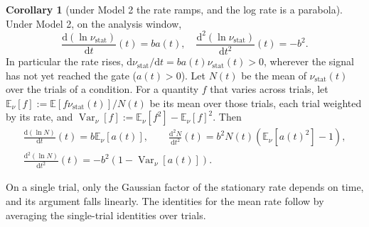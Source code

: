 \documentclass[a4paper,11pt]{article}
\theoremstyle{definition}
\newtheorem{corollary}[proposition]{Corollary}
\newcommand{\E}{\mathbb E}
\newcommand{\Var}{\operatorname{Var}}
\newcommand{\dd}{\mathrm d}
\newcommand{\nustat}{{\nu }_{\mathrm{stat}}}
\newcommand{\1}{\mathbbm{1}}
\begin{document}
\begin{corollary}[under Model 2 the rate ramps, and the log rate is a parabola]\label{cor:logslope}
Under Model 2, on the analysis window,
\begin{equation}
\frac{\dd \left(\ln \nustat \right)}{\dd t}\left(t\right)=b a\left(t\right), \quad \frac{{\dd }^{2}\left(\ln \nustat \right)}{\dd {t}^{2}}\left(t\right)=-{b}^{2}.
\label{eq:slope}
\end{equation}
In particular the rate rises, $\dd \nustat /\dd t=b a\left(t\right)\nustat \left(t\right)>0$, wherever the signal has not yet reached the gate ($a(t)>0$). Let $N\left(t\right)$ be the mean of $\nustat \left(t\right)$ over the trials of a condition. For a quantity $f$ that varies across trials, let ${\E}_{\nu }[f]:=\E\left[f\nustat(t)\right]/N(t)$ be its mean over those trials, each trial weighted by its rate, and ${\Var}_{\nu }[f]:={\E}_{\nu }[f^{2}]-{\E}_{\nu }[f]^{2}$. Then
\begin{equation}
\begin{gathered}
\frac{\dd \left(\ln N\right)}{\dd t}\left(t\right)=b{\E}_{\nu }\left[a\left(t\right)\right], \qquad \frac{{\dd }^{2}N}{\dd {t}^{2}}\left(t\right)={b}^{2}N\left(t\right)\left({\E}_{\nu }\left[{a\left(t\right)}^{2}\right]-1\right),\\ \frac{{\dd }^{2}\left(\ln N\right)}{\dd {t}^{2}}\left(t\right)=-{b}^{2}\left(1-{\Var}_{\nu }\left[a\left(t\right)\right]\right).
\end{gathered}
\label{eq:slope_cond}
\end{equation}
\end{corollary}

On a single trial, only the Gaussian factor of the stationary rate depends on time, and its argument falls linearly. The identities for the mean rate follow by averaging the single-trial identities over trials.
\end{document}
